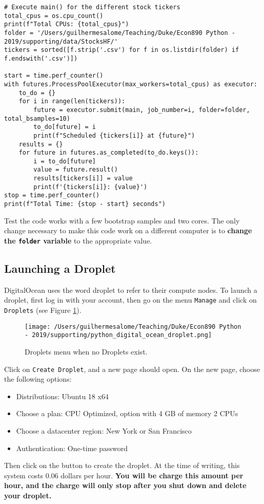 \documentclass[12pt, a4paper]{article}
\begin{document}
\begin{lstlisting}
# Execute main() for the different stock tickers
total_cpus = os.cpu_count()
print(f"Total CPUs: {total_cpus}")
folder = '/Users/guilhermesalome/Teaching/Duke/Econ890 Python - 2019/supporting/data/StocksHF/'
tickers = sorted([f.strip('.csv') for f in os.listdir(folder) if f.endswith('.csv')])

start = time.perf_counter()
with futures.ProcessPoolExecutor(max_workers=total_cpus) as executor:
    to_do = {}
    for i in range(len(tickers)):
        future = executor.submit(main, job_number=i, folder=folder, total_bsamples=10)
        to_do[future] = i
        print(f"Scheduled {tickers[i]} at {future}")
    results = {}
    for future in futures.as_completed(to_do.keys()):
        i = to_do[future]
        value = future.result()
        results[tickers[i]] = value
        print(f'{tickers[i]}: {value}')
stop = time.perf_counter()
print(f"Total Time: {stop - start} seconds")
\end{lstlisting}
Test the code works with a few bootstrap samples and two cores.
The only change necessary to make this code work on a different computer is to \textbf{\textbf{change the \texttt{folder} variable}} to the appropriate value.
\subsection{Launching a Droplet}
\label{sec:org74f49b8}
DigitalOcean uses the word droplet to refer to their compute nodes.
To launch a droplet, first log in with your account, then go on the menu \texttt{Manage} and click on \texttt{Droplets} (see Figure \ref{fig:orgae1054d}).

\begin{figure}[H]
\centering
\texttt{[image: /Users/guilhermesalome/Teaching/Duke/Econ890 Python - 2019/supporting/python\_digital\_ocean\_droplet.png]}
\caption{\label{fig:orgae1054d}
Droplets menu when no Droplets exist.}
\end{figure}

Click on \texttt{Create Droplet}, and a new page should open.
On the new page, choose the following options:
\begin{itemize}
\item Distributions: Ubuntu 18 x64
\item Choose a plan: CPU Optimized, option with 4 GB of memory 2 CPUs
\item Choose a datacenter region: New York or San Francisco
\item Authentication: One-time password
\end{itemize}
Then click on the button to create the droplet.
At the time of writing, this system costs 0.06 dollars per hour.
\textbf{\textbf{You will be charge this amount per hour, and the charge will only stop after you shut down and delete your droplet.}}
\end{document}
